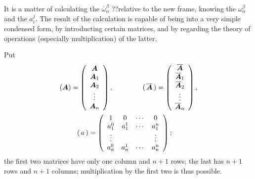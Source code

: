 It is a matter of calculating the $\overline \omega^\beta_\alpha$ ??relative to the new frame, knowing the $\omega^\beta_\alpha$ and the $a^j_i$. The result of the calculation is capable of being into a very simple condensed form, by introducting certain matrices, and by regarding the theory of operations (especially multiplication) of the latter.

Put
\begin{eqnarray*}
(\bm A) = \left(
\begin{array}{c}
\bm A \\  \bm A_1 \\\bm A_2 \\ \vdots \\ \bm A_n 
\end{array}
\right), \hspace*{1.5cm}
(\, \overline{\bm A}\,) = \left(
\begin{array}{c}
\overline{\bm A} \\  \overline{\bm A}_1 \\ \overline{\bm A}_2 \\ \vdots \\ \overline{\bm A}_n 
\end{array}
\right), 
\\
(\, a\,) = \left(
\begin{array}{cccc}
1 &  0  & \cdots & 0 \\
a^0_1 &  a^1_1  & \cdots & a^n_1 \\
\vdots &    &  & \vdots \\
a^0_n &  a^1_n  & \cdots & a^n_n 
\end{array}
\right);  \hspace*{1.3cm}
\end{eqnarray*}
the first two matrices have only one column and $n+1$ rows; the last has $n+1$ rows and $n+1$ columns; multiplication by the first two is thus possible. 

